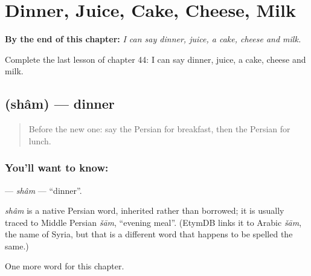 
\chapter{Dinner, Juice, Cake, Cheese, Milk}
\label{ch:fa-dinner-juice-cake-cheese-milk}

\begin{chapteropening}
\textbf{By the end of this chapter:} \emph{I can say dinner, juice, a cake, cheese and milk.}

Complete the last lesson of chapter 44: I can say dinner, juice, a cake, cheese and milk.
\end{chapteropening}

\section[\texorpdfstring{\fa{شام} (shâm)}{شام (shâm)}]{ (shâm) — dinner}

\label{lesson:FA-C44-sham}



\begin{quote}
Before the new one: say the Persian for breakfast, then the Persian for lunch.
\end{quote}

\subsection*{You'll want to know: }
\textbf{} — \emph{shâm} — \textquotedblleft{}dinner\textquotedblright{}.

\begin{cousinweb}
\emph{shâm} is a native Persian word, inherited rather than borrowed; it is usually traced to Middle Persian \emph{šām}, \textquotedblleft{}evening meal\textquotedblright{}. (EtymDB links it to Arabic \emph{šām}, the name of Syria, but that is a different word that happens to be spelled the same.)
\end{cousinweb}

\begin{grammarlens}[title={What you've built}]
One more word for this chapter.
\end{grammarlens}


